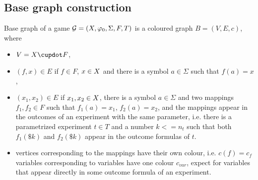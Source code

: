 \subsection{Base graph construction}
Base graph of a game $\mathcal{G} = (X, \varphi_0, \Sigma, F, T)$ is a coloured graph $B = (V,E,c)$, where
\begin{itemize}
\item $V = \Var \cupdot F$,
\item $(f, x) \in E$ if $f\in F$, $x\in X$ and there is a symbol $a\in\Sigma$ such that $f(a) = x$,
\item $(x_1, x_2) \in E$ if $x_1,x_2\in X$, there is a symbol $a\in\Sigma$ and two mappings
  $f_1,f_2\in F$ such that $f_1(a) = x_1$, $f_2(a) = x_2$, and
  the mappings appear in the outcomes of an experiment with the same parameter, i.e.
  there is a parametrized experiment $t\in T$ and a number $k <= n_t$ such that
  both $f_1(\$k)$ and $f_2(\$k)$ appear in the outcome formulas of $t$.
\item
  vertices corresponding to the mappings have their own colour, i.e. $c(f) = c_f$
  variables corresponding to variables have one colour $c_{var}$,
  expect for variables that appear directly in some outcome formula of an experiment.
\end{itemize}


